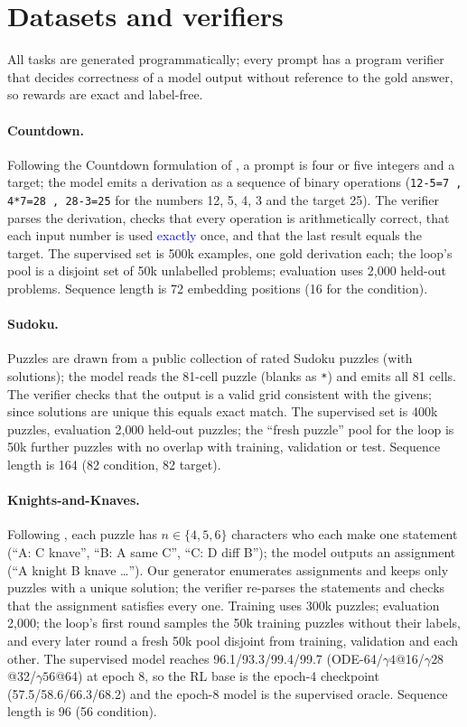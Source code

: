 \section{Datasets and verifiers}
\label{app:datasets}
All tasks are generated programmatically; every prompt has a program verifier that decides correctness of a model output without reference to the gold answer, so rewards are exact and label-free.

\paragraph{Countdown.}
Following the Countdown formulation of \citet{gandhi2024sos}, a prompt is four or five integers and a target; the model emits a derivation as a sequence of binary operations (\texttt{12-5=7 , 4*7=28 , 28-3=25} for the numbers 12, 5, 4, 3 and the target 25). The verifier parses the derivation, checks that every operation is arithmetically correct, that each input number is used \textcolor{blue}{exactly} once, and that the last result equals the target. The supervised set is 500k examples, one gold derivation each; the loop's pool is a disjoint set of 50k unlabelled problems; evaluation uses 2{,}000 held-out problems. Sequence length is 72 embedding positions (16 for the condition).

\paragraph{Sudoku.}
Puzzles are drawn from a public collection of rated Sudoku puzzles (with solutions); the model reads the 81-cell puzzle (blanks as \texttt{*}) and emits all 81 cells. The verifier checks that the output is a valid grid consistent with the givens; since solutions are unique this equals exact match. The supervised set is 400k puzzles, evaluation 2{,}000 held-out puzzles; the ``fresh puzzle'' pool for the loop is 50k further puzzles with no overlap with training, validation or test. Sequence length is 164 (82 condition, 82 target).

\paragraph{Knights-and-Knaves.}
Following \citet{xie2024kk}, each puzzle has $n\in\{4,5,6\}$ characters who each make one statement (``A: C knave'', ``B: A same C'', ``C: D diff B''); the model outputs an assignment (``A knight B knave \dots''). Our generator enumerates assignments and keeps only puzzles with a unique solution; the verifier re-parses the statements and checks that the assignment satisfies every one. Training uses 300k puzzles; evaluation 2{,}000; the loop's first round samples the 50k training puzzles without their labels, and every later round a fresh 50k pool disjoint from training, validation and each other. The supervised model reaches 96.1/93.3/99.4/99.7 (ODE-64/$\gamma4$@16/$\gamma28$@32/$\gamma56$@64) at epoch 8, so the RL base is the epoch-4 checkpoint (57.5/58.6/66.3/68.2) and the epoch-8 model is the supervised oracle. Sequence length is 96 (56 condition).

